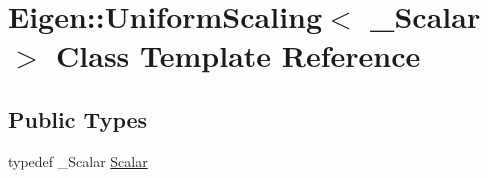 \hypertarget{class_eigen_1_1_uniform_scaling}{}\section{Eigen\+::Uniform\+Scaling$<$ \+\_\+\+Scalar $>$ Class Template Reference}
\label{class_eigen_1_1_uniform_scaling}
\subsection*{Public Types}
\begin{DoxyCompactItemize}
\item 
typedef \+\_\+\+Scalar \mbox{\hyperlink{class_eigen_1_1_uniform_scaling_a04c4339f58f1210c5d4d34b1bd7ae283}{Scalar}}
\end{DoxyCompactItemize}
